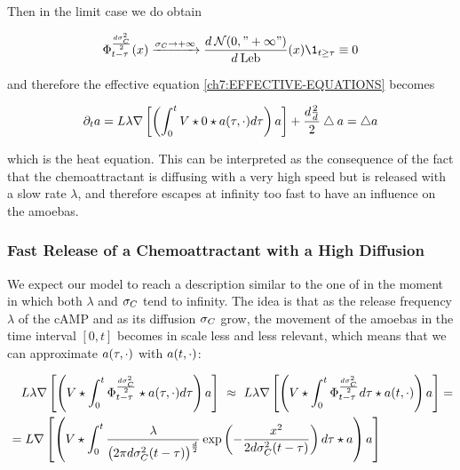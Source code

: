 Then in the limit case we do obtain

\begin{equation*}
		\heatkernel_{t-\tau}^{\frac{d\sigma_\camp^2}{2}}(x)
	\xrightarrow{\diffusion_\camp \rightarrow +\infty}
		\frac{d\: \Normal(0, "+\infty")}{d\:\lebsge} (x)
		\1_{t\geq \tau} 
		\equiv
		0
\end{equation*}

and therefore the effective equation \ref{ch7:EFFECTIVE-EQUATIONS} becomes

\begin{equation*}\label{conc:sigmaC-goes-infty}
	\partial_t a =  L\lambda \nabla \left[ \left( \int_0^t
	V \star 0 \star a(\tau, \cdot) 
	d \tau
	\right)
	a
	\right]
	+ \frac{d \frac{2}{d}}{2} \bigtriangleup a
	=
	\bigtriangleup a
\end{equation*}

which is the heat equation.
This can be interpreted as the consequence of the fact that the chemoattractant is diffusing with a very high speed but is released with a slow rate $\lambda$, and therefore escapes at infinity too fast to have an influence on the amoebas.

\subsubsection{Fast Release of a Chemoattractant with a High Diffusion}

We expect our model to reach a description similar to the one of \cite{ana} in the moment in which both $\lambda$ and $\sigma_C$ tend to infinity.
The idea is that as the release frequency $\lambda$ of the cAMP and as its diffusion $\sigma_C$ grow, the movement of the amoebas in the time interval $[0,t]$ becomes in scale less and less relevant, which means that we can approximate $a(\tau, \cdot)$ with $a(t,\cdot)$:

\begin{align*}
	&\quad
		 L\lambda \nabla \left[ \left(
		V
		\star	
		\int_0^t
		\Phi_{t-\tau}^{\frac{d\sigma_C^2}{2}} 
		\star a(\tau, \cdot) 
		d \tau
		\right)
		a
		\right]\
	\approx\
		L\lambda \nabla \left[ \left(
		V
		\star	
		\int_0^t
		\Phi_{t-\tau}^{\frac{d\sigma_C^2}{2}} 
		d \tau
		\star a(t, \cdot) 
		\right)
		a
		\right]
		=
	\\
	&=
		L \nabla \left[ \left( 
		V \star 
		\int_0^t
		\frac{\lambda}{
			\big( 2\pi d\sigma_C^2 (t-\tau) \big)^{\frac{d}{2}}
		}
		\exp \left(
		-\frac{x^2}{2 d\sigma_C^2 (t-\tau)}
		\right)
		d \tau
		\star a
		\right)
		a
		\right]
\end{align*}

